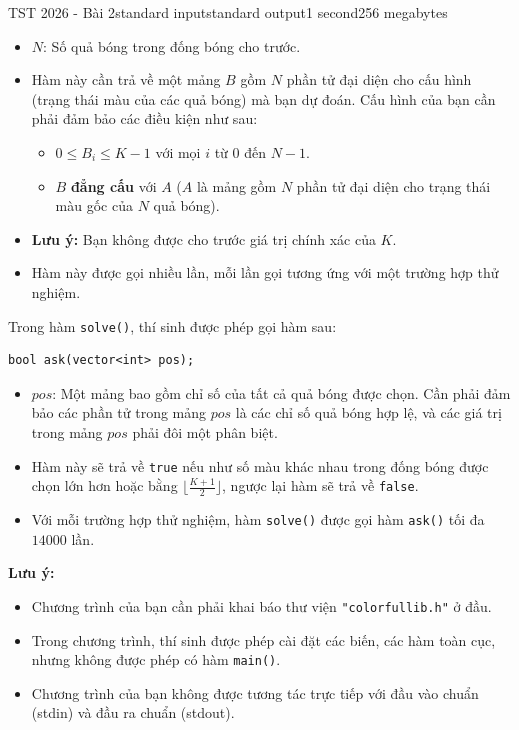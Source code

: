 \begin{problem}{TST 2026 - Bài 2}{standard input}{standard output}{1 second}{256 megabytes}
\begin{itemize}
   \item $N$: Số quả bóng trong đống bóng cho trước.
   \item Hàm này cần trả về một mảng $B$ gồm $N$ phần tử đại diện cho cấu hình (trạng thái màu của các quả bóng) mà bạn dự đoán. Cấu hình của bạn cần phải đảm bảo các điều kiện như sau:
   \begin{itemize}
      \item $0\le B_i\le K-1$ với mọi $i$ từ $0$ đến $N-1$.
      \item $B$ \textbf{đẳng cấu} với $A$ ($A$ là mảng gồm $N$ phần tử đại diện cho trạng thái màu gốc của $N$ quả bóng).
   \end{itemize}
   \item \textbf{Lưu ý:} Bạn không được cho trước giá trị chính xác của $K$.
   \item Hàm này được gọi nhiều lần, mỗi lần gọi tương ứng với một trường hợp thử nghiệm.
\end{itemize}

Trong hàm \texttt{solve()}, thí sinh được phép gọi hàm sau:

\begin{lstlisting}
bool ask(vector<int> pos);
\end{lstlisting}

\begin{itemize}
   \item $pos$: Một mảng bao gồm chỉ số của tất cả quả bóng được chọn. Cần phải đảm bảo các phần tử trong mảng $pos$ là các chỉ số quả bóng hợp lệ, và các giá trị trong mảng $pos$ phải đôi một phân biệt.
   \item Hàm này sẽ trả về \texttt{true} nếu như số màu khác nhau trong đống bóng được chọn lớn hơn hoặc bằng $\lfloor \frac{K+1}2\rfloor$, ngược lại hàm sẽ trả về \texttt{false}.
   \item Với mỗi trường hợp thử nghiệm, hàm \texttt{solve()} được gọi hàm \texttt{ask()} tối đa $14000$ lần.
\end{itemize}

\textbf{Lưu ý:}
\begin{itemize}
   \item Chương trình của bạn cần phải khai báo thư viện \texttt{"colorfullib.h"} ở đầu.
   \item Trong chương trình, thí sinh được phép cài đặt các biến, các hàm toàn cục, nhưng không được phép có hàm \texttt{main()}.
   \item Chương trình của bạn không được tương tác trực tiếp với đầu vào chuẩn (stdin) và đầu ra chuẩn (stdout).
\end{itemize}


\end{problem}
